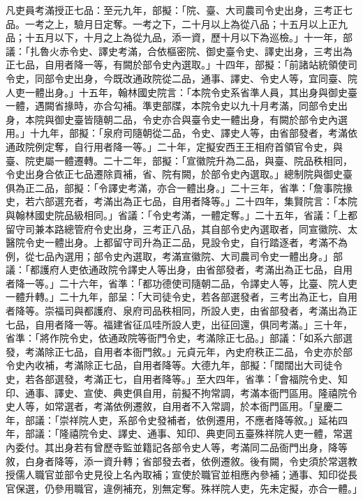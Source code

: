 \begin{pinyinscope}
 凡吏員考滿授正七品：至元九年，部擬：「院、臺、大司農司令史出身，三考正七品。一考之上，驗月日定奪。一考之下，二十月以上為從八品；十五月以上正九品；十五月以下，十月之上為從九品，添一資，歷十月以下為巡檢。」十一年，部議：「扎魯火赤令史、譯史考滿，合依樞密院、御史臺令史、譯史出身，三考出為正七品，自用者降一等，有闕於部令史內選取。」十四年，部擬：「前諸站統領使司令史，同部令史出身，今既改通政院從二品，通事、譯史、令史人等，宜同臺、院人吏一體出身。」十五年，翰林國史院言：「本院令史系省準人員，其出身與御史臺一體，遇闕省掾時，亦合勾補。準吏部牒，本院令史以九十月考滿，同部令史出身，本院與御史臺皆隨朝二品，令史亦合與臺令史一體出身，有闕於部令史內選用。」十九年，部擬：「泉府司隨朝從二品，令史、譯史人等，由省部發者，考滿依通政院例定奪，自行用者降一等。」二十年，定擬安西王王相府首領官令史，與臺、院吏屬一體遷轉。二十二年，部擬：「宣徽院升為二品，與臺、院品秩相同，令史出身合依正七品遷除貢補，省、院有闕，於部令史內選取。」總制院與御史臺俱為正二品，部擬：「令譯史考滿，亦合一體出身。」二十三年，省準：「詹事院掾史，若六部選充者，考滿出為正七品，自用者降等。」二十四年，集賢院言：「本院與翰林國史院品級相同。」省議：「令史考滿，一體定奪。」二十五年，省議：「上都留守司兼本路總管府令史出身，三考正八品，其自部令史內選取者，同宣徽院、太醫院令史一體出身。上都留守司升為正二品，見設令史，自行踏逐者，考滿不為例，從七品內選用；部令史內選取，考滿宣徽院、大司農司令史一體出身。」部議：「都護府人吏依通政院令譯史人等出身，由省部發者，考滿出為正七品，自用者降一等。」二十六年，省準：「都功德使司隨朝二品，令譯史人等，比臺、院人吏一體升轉。」二十九年，部呈：「大司徒令史，若各部選發者，三考出為正七，自用者降等。崇福司與都護府、泉府司品秩相同，所設人吏，由省部發者，考滿出為正七品，自用者降一等。福建省征瓜哇所設人吏，出征回還，俱同考滿。」三十年，省準：「將作院令史，依通政院等衙門令史，考滿除正七品。」部議：「如系六部選發，考滿除正七品，自用者本衙門敘。」元貞元年，內史府秩正二品，令史亦於部令史內收補，考滿除正七品，自用者降等。大德九年，部擬：「闊闊出大司徒令史，若各部選發，考滿正七，自用者降等。」至大四年，省準：「會福院令史、知印、通事、譯史、宣使、典吏俱自用，前擬不拘常調，考滿本衙門區用。隆禧院令史人等，如常選者，考滿依例遷敘，自用者不入常調，於本衙門區用。「皇慶二年，部議：「崇祥院人吏，系部令史發補者，依例遷用，不應者降等敘。」延祐四年，部議：「隆禧院令史、譯史、通事、知印、典吏同五臺殊祥院人吏一體，常選內委付。其出身若有曾歷寺監並籍記各部令史人等，考滿同二品衙門出身，降等敘，白身者降等，添一資升轉；省部發去者，依例遷敘。後有闕，令史須於常選教授儒人職官並部令史見役上名內取補；宣使於職官並相應內參補；通事、知印從長官保選，仍參用職官，違例補充，別無定奪。殊祥院人吏，先未定擬，亦合一體。」




\end{pinyinscope}
